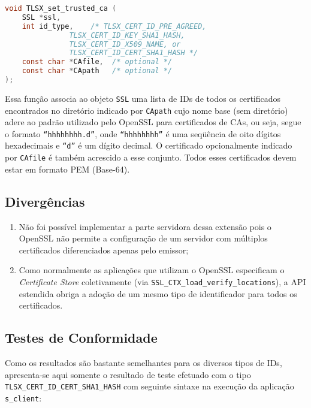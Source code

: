 \begin{lstlisting}[language=C,emph={TLSX_set_trusted_ca},caption={API Estendida para a extensão \acs{TCI}}]
void TLSX_set_trusted_ca (
    SSL *ssl,
    int id_type,    /* TLSX_CERT_ID_PRE_AGREED,
		       TLSX_CERT_ID_KEY_SHA1_HASH,
		       TLSX_CERT_ID_X509_NAME, or
		       TLSX_CERT_ID_CERT_SHA1_HASH */
    const char *CAfile,  /* optional */
    const char *CApath   /* optional */
);
\end{lstlisting}

Essa função associa ao objeto \verb|SSL| uma lista de IDs de todos os certificados 
encontrados no diretório indicado por \verb|CApath| cujo nome base (sem diretório) 
adere ao padrão utilizado pelo OpenSSL para certificados de \acsp{CA}, ou seja, 
segue o formato \texttt{``hhhhhhhh.d''}, onde \texttt{``hhhhhhhh''} é uma seqüência de oito 
dígitos hexadecimais e \texttt{``d''} é um dígito decimal. O certificado opcionalmente 
indicado por \verb|CAfile| é também acrescido a esse conjunto. Todos esses 
certificados devem estar em formato \acs{PEM} (Base-64).

\subsection{Divergências}

\begin{enumerate}

\item Não foi possível implementar a parte servidora dessa extensão pois o OpenSSL não permite a configuração de um servidor com múltiplos certificados diferenciados apenas pelo emissor;

\item Como normalmente as aplicações que utilizam o OpenSSL especificam o
\emph{Certificate Store} coletivamente (via \verb|SSL_CTX_load_verify_locations|),
a API estendida obriga a adoção de um mesmo tipo de 
identificador para todos os certificados.

\end{enumerate}

\subsection{Testes de Conformidade}

Como os resultados são bastante semelhantes para os diversos tipos de IDs, 
apresenta-se aqui somente o resultado de teste efetuado com o tipo 
\verb|TLSX_CERT_ID_CERT_SHA1_HASH| com seguinte sintaxe na execução da aplicação 
\verb|s_client|:

